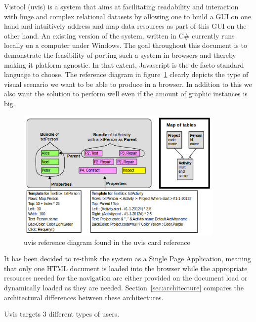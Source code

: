 Vistool (uvis) is a system that aims at facilitating readability and interaction with huge and complex relational datasets by allowing one to build a GUI on one hand and intuitively address and map data resources as part of this GUI on the other hand. An existing version of the system, written in C\# currently runs locally on a computer under Windows. The goal throughout this document is to demonstrate the feasibility of porting such a system in browsers and thereby making it platform agnostic. In that extent, Javascript is the de facto standard language to choose. The reference diagram in figure~\ref{img:refDiagram} clearly depicts the type of visual scenario we want to be able to produce in a browser. In addition to this we also want the solution to perform well even if the amount of graphic instances is big.

\begin{figure}
    \centering
    \includegraphics[width=0.9\textwidth]{images/uvisDiagram.png}
    \caption{uvis reference diagram found in the uvis card reference}
    \label{img:refDiagram}
\end{figure}

It has been decided to re-think the system as a Single Page Application, meaning that only one HTML document is loaded into the browser while the appropriate resources needed for the navigation are either provided on the document load or dynamically loaded as they are needed. Section~\ref{sec:architecture} compares the architectural differences between these architectures.

Uvis targets 3 different types of users.

